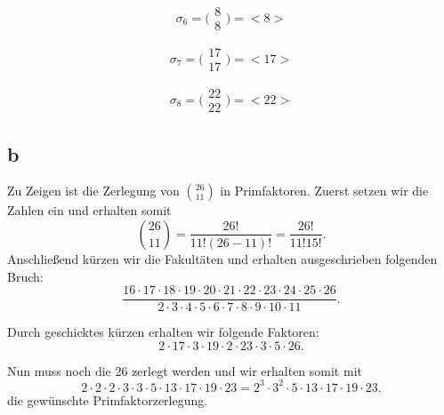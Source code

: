 \documentclass[12pt]{article}
\begin{document}
\begin{equation*}
\sigma_6 =
\bigl(\begin{smallmatrix}
8 \\
8
\end{smallmatrix}\bigr) = \bigl < 8 \bigr >
\end{equation*}

\begin{equation*}
\sigma_7 =
\bigl(\begin{smallmatrix}
17 \\
17
\end{smallmatrix}\bigr) = \big < 17 \big >
\end{equation*}

\begin{equation*}
\sigma_8 =
\bigl(\begin{smallmatrix}
22 \\
22
\end{smallmatrix}\bigr) = \bigl < 22 \bigr >
\end{equation*}

\subsection*{b}
Zu Zeigen ist die Zerlegung von $\binom{26}{11}$ in Primfaktoren. Zuerst setzen wir die Zahlen
ein und erhalten somit
\begin{equation*}
\binom{26}{11} = \frac{26!}{11!(26-11)!} = \frac{26!}{11!15!}.
\end{equation*}
Anschließend kürzen wir die Fakultäten und erhalten ausgeschrieben folgenden Bruch:
\begin{equation*}
\frac{16 \cdot 17 \cdot 18 \cdot 19 \cdot 20 \cdot 21 \cdot 22 \cdot 23 \cdot 24 \cdot 25 
\cdot 26}{2 \cdot 3 \cdot 4 \cdot 5 \cdot 6 \cdot 7 \cdot 8 \cdot 9 \cdot 10 \cdot 11}.
\end{equation*}

Durch geschicktes kürzen erhalten wir folgende Faktoren:
\begin{equation*}
2 \cdot 17 \cdot 3 \cdot 19 \cdot 2 \cdot 23 \cdot 3 \cdot 5 \cdot 26.
\end{equation*}

Nun muss noch die 26 zerlegt werden und wir erhalten somit mit
\begin{equation*}
2 \cdot 2 \cdot 2 \cdot 3 \cdot 3 \cdot 5 \cdot 13 \cdot 17 \cdot 19 \cdot 23 = 2^3  \cdot  3^2  \cdot 5  \cdot 13 \cdot 17 \cdot 19 \cdot 23.
\end{equation*}
die gewünschte Primfaktorzerlegung.
\end{document}
